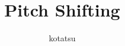 \documentclass{article}
\begin{document}
	\title{Pitch Shifting}
	\author{kotatsu}
	\date{}
	\maketitle
	\tableofcontents



\listofalgorithms
\printbibliography
\end{document}
